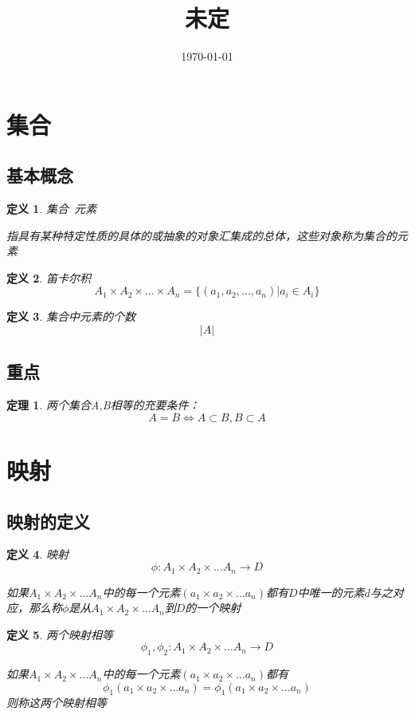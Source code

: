 \documentclass[hyperref,UTF8]{ctexart}
\title{未定}
\date{\today}
\newtheorem{theorem}{定理}[subsection]
\newtheorem{definition}{定义}[subsection]
\begin{document}
	\maketitle

	\tableofcontents
\section{集合}
	\subsection{基本概念}
	\begin{definition}
	集合\ 元素	
	
	指具有某种特定性质的具体的或抽象的对象汇集成的总体，这些对象称为集合的元素
	

	\end{definition}
	\begin{definition}{笛卡尔积}
	\[ A_1\times A_2 \times \dots \times A_n=\{(a_1,a_2,\dots,a_n)|a_i\in A_i\}\]
	\end{definition}

	\begin{definition}
		集合中元素的个数\[|A|\]
	\end{definition}


	\subsection{重点}
	\begin{theorem}
	两个集合A,B相等的充要条件：\[A=B\iff A\subset B,B\subset A\]
	\end{theorem}

\section{映射}

		\subsection{映射的定义}
		
		
	\begin{definition}
		映射
		\[\phi{:}A_1\times A_2\times \dots A_n \to D\]
		
		如果$A_1\times A_2\times \dots A_n$中的每一个元素$(a_1\times a_2\times \dots a_n)$都有$D$中唯一的元素$d$与之对应，那么称$\phi $是从$A_1\times A_2\times \dots A_n$到$D$的一个映射
	\end{definition}

	\begin{definition}
		两个映射相等
		\[\phi_1,\phi_2{:}A_1\times A_2\times \dots A_n \to D\]
		
		如果$A_1\times A_2\times \dots A_n$中的每一个元素$(a_1\times a_2\times \dots a_n)$都有\[\phi_1(a_1\times a_2\times \dots a_n)=\phi_1(a_1\times a_2\times \dots a_n)\]
		则称这两个映射相等
	\end{definition}
\end{document}
